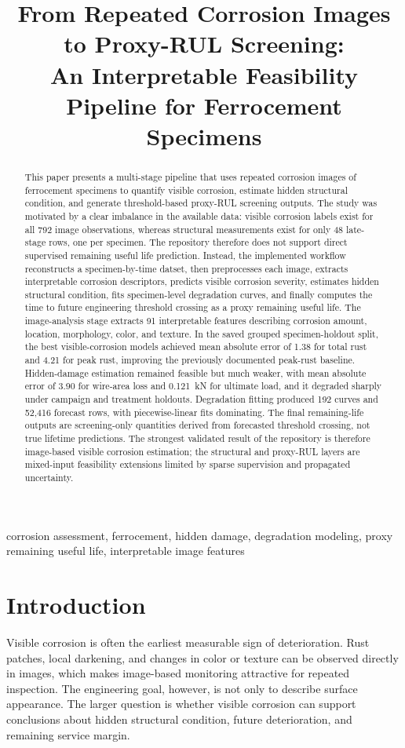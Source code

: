 \documentclass[conference]{IEEEtran}
\title{From Repeated Corrosion Images to Proxy-RUL Screening:\\An Interpretable Feasibility Pipeline for Ferrocement Specimens}
\author{\IEEEauthorblockN{Parastoo Hashemi Alvar}
\IEEEauthorblockA{\textit{Politecnico di Torino} \\
s339438 \\
s339438@studenti.polito.it}
}
\begin{document}
\maketitle

\begin{abstract}
This paper presents a multi-stage pipeline that uses repeated corrosion images of ferrocement specimens to quantify visible corrosion, estimate hidden structural condition, and generate threshold-based proxy-RUL screening outputs. The study was motivated by a clear imbalance in the available data: visible corrosion labels exist for all 792 image observations, whereas structural measurements exist for only 48 late-stage rows, one per specimen. The repository therefore does not support direct supervised remaining useful life prediction. Instead, the implemented workflow reconstructs a specimen-by-time datset, then preprocesses each image, extracts interpretable corrosion descriptors, predicts visible corrosion severity, estimates hidden structural condition, fits specimen-level degradation curves, and finally computes the time to future engineering threshold crossing as a proxy remaining useful life. The image-analysis stage extracts 91 interpretable features describing corrosion amount, location, morphology, color, and texture. In the saved grouped specimen-holdout split, the best visible-corrosion models achieved mean absolute error of 1.38 for total rust and 4.21 for peak rust, improving the previously documented peak-rust baseline. Hidden-damage estimation remained feasible but much weaker, with mean absolute error of 3.90 for wire-area loss and 0.121~kN for ultimate load, and it degraded sharply under campaign and treatment holdouts. Degradation fitting produced 192 curves and 52{,}416 forecast rows, with piecewise-linear fits dominating. The final remaining-life outputs are screening-only quantities derived from forecasted threshold crossing, not true lifetime predictions. The strongest validated result of the repository is therefore image-based visible corrosion estimation; the structural and proxy-RUL layers are mixed-input feasibility extensions limited by sparse supervision and propagated uncertainty.
\end{abstract}

\begin{IEEEkeywords}
corrosion assessment, ferrocement, hidden damage, degradation modeling, proxy remaining useful life, interpretable image features
\end{IEEEkeywords}

\section{Introduction}
Visible corrosion is often the earliest measurable sign of deterioration. Rust patches, local darkening, and changes in color or texture can be observed directly in images, which makes image-based monitoring attractive for repeated inspection. The engineering goal, however, is not only to describe surface appearance. The larger question is whether visible corrosion can support conclusions about hidden structural condition, future deterioration, and remaining service margin.
\end{document}
